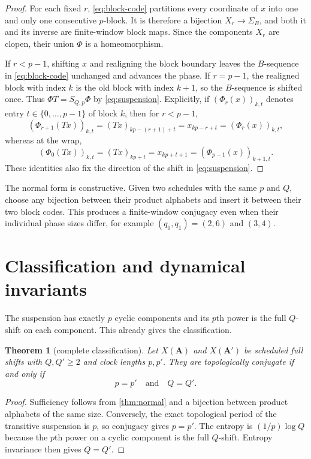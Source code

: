 \documentclass[11pt,a4paper]{amsart}
\newtheorem{theorem}{Theorem}[section]
\theoremstyle{definition}
\theoremstyle{remark}
\begin{document}
\begin{proof}
For each fixed $r$, \eqref{eq:block-code} partitions every coordinate of
$x$ into one and only one consecutive $p$-block.  It is therefore a bijection
$X_r\to\Sigma_B$, and both it and its inverse are finite-window block maps.
Since the components $X_r$ are clopen, their union $\Phi$ is a homeomorphism.

If $r<p-1$, shifting $x$ and realigning the block boundary leaves the
$B$-sequence in \eqref{eq:block-code} unchanged and advances the phase.  If
$r=p-1$, the realigned block with index $k$ is the old block with index
$k+1$, so the $B$-sequence is shifted once.  Thus
$\Phi T=S_{Q,p}\Phi$ by \eqref{eq:suspension}.
Explicitly, if $(\Phi_r(x))_{k,t}$ denotes entry $t\in\{0,\ldots,p-1\}$
of block $k$, then for $r<p-1$,
\[
 (\Phi_{r+1}(Tx))_{k,t}
 =(Tx)_{kp-(r+1)+t}=x_{kp-r+t}=(\Phi_r(x))_{k,t},
\]
whereas at the wrap,
\[
 (\Phi_0(Tx))_{k,t}
 =(Tx)_{kp+t}=x_{kp+t+1}=(\Phi_{p-1}(x))_{k+1,t}.
\]
These identities also fix the direction of the shift in
\eqref{eq:suspension}.
\end{proof}

The normal form is constructive.  Given two schedules with the same $p$ and
$Q$, choose any bijection between their product alphabets and insert it
between their two block codes.  This produces a finite-window conjugacy even
when their individual phase sizes differ, for example
$(q_0,q_1)=(2,6)$ and $(3,4)$.

\section{Classification and dynamical invariants}

The suspension has exactly $p$ cyclic components and its $p$th power is the
full $Q$-shift on each component.  This already gives the classification.

\begin{theorem}[complete classification]\label{thm:classification}
Let $X(\mathbf A)$ and $X(\mathbf A')$ be scheduled full shifts with
$Q,Q'\geq2$ and clock lengths $p,p'$.  They are topologically
conjugate if and only if
\[
 p=p'\quad\text{and}\quad Q=Q'.
\]
\end{theorem}

\begin{proof}
Sufficiency follows from \cref{thm:normal} and a bijection between product
alphabets of the same size.  Conversely, the exact topological period of the
transitive suspension is $p$, so conjugacy gives $p=p'$.  The entropy is
$(1/p)\log Q$ because the $p$th power on a cyclic component is the full
$Q$-shift.  Entropy invariance then gives $Q=Q'$.
\end{proof}
\end{document}
